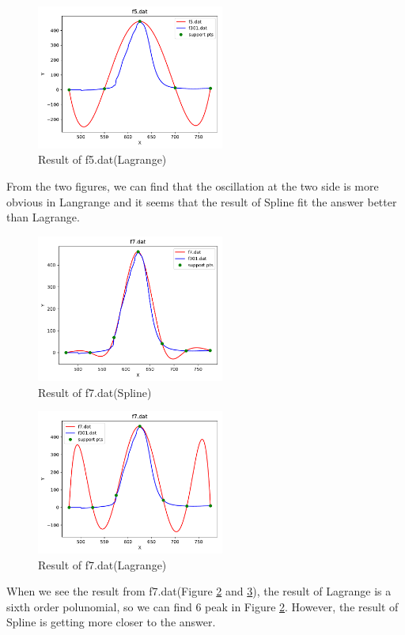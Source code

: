 \documentclass{article}
\begin{document}
\begin{figure}[H]
    \centering
    \includegraphics[width=0.55\textwidth]{src/f5_l.pdf}
    \caption{Result of f5.dat(Lagrange)}
    \label{fig:f5l}
\end{figure}
From the two figures, we can find that the oscillation at the two side is more obvious in Langrange and it seems that the result of Spline 
fit the answer better than Lagrange.
\begin{figure}[H]
    \centering
    \includegraphics[width=0.55\textwidth]{src/f7.pdf}
    \caption{Result of f7.dat(Spline)}
    \label{fig:f7}
\end{figure}
\begin{figure}[H]
    \centering
    \includegraphics[width=0.55\textwidth]{src/f7_l.pdf}
    \caption{Result of f7.dat(Lagrange)}
    \label{fig:f7l}
\end{figure}
When we see the result from f7.dat(Figure \ref{fig:f7} and \ref{fig:f7l}), the result of Lagrange is a sixth order polunomial, so we can find 6
peak in Figure \ref{fig:f7}. However, the result of Spline is getting more closer to the answer.
\end{document}
